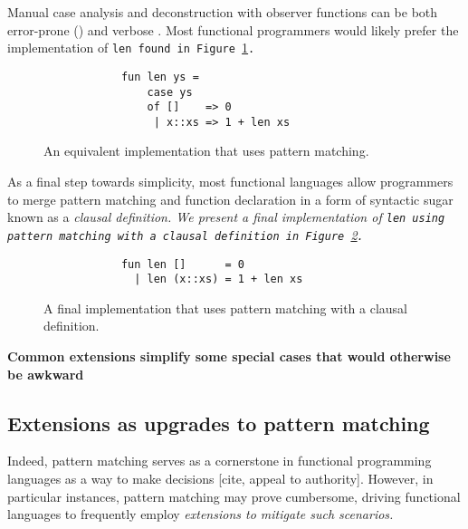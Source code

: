 \documentclass[manuscript,screen,review, 12pt]{acmart}
\begin{document}
\begin{outline}[enumerate]
    Manual case analysis and deconstruction with observer functions can be both
    error-prone () and verbose . Most functional programmers would likely prefer the
    implementation of \tt{len} found in Figure~\ref{fig:pmlen}.
    \begin{figure}[htt]
    \begin{verbatim}
            fun len ys =
                case ys 
                of []    => 0
                 | x::xs => 1 + len xs
        \end{verbatim}

    \caption{An equivalent implementation that uses pattern matching.}
    \label{fig:pmlen}
    \end{figure}

    As a final step towards simplicity, most functional languages allow
    programmers to merge pattern matching and function declaration in a form of
    syntactic sugar known as a \it{clausal definition}. We present a final
    implementation of \tt{len} using pattern matching with a clausal definition
    in Figure~\ref{fig:pmclausallen}.

    \begin{figure}[ht]
    \smllst
    \begin{verbatim}
            fun len []      = 0
              | len (x::xs) = 1 + len xs
        \end{verbatim}
    \caption{A final implementation that uses pattern matching with a clausal definition.}
    \label{fig:pmclausallen}
    \end{figure}
        

    \1 \bf{Common extensions simplify some special cases that would otherwise be awkward}
\subsection{Extensions as upgrades to pattern matching}

    Indeed, pattern matching serves as a cornerstone in functional programming
    languages as a way to make decisions [cite, appeal to authority]. However,
    in particular instances, pattern matching may prove cumbersome, driving
    functional languages to frequently employ \it{extensions} to mitigate such
    scenarios. 
    

\end{outline}
\end{document}
